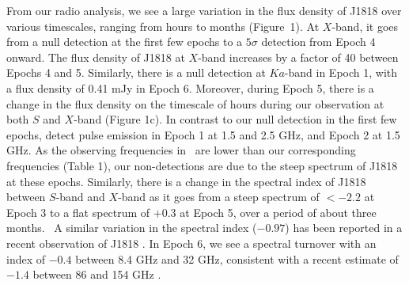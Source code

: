 \documentclass[twocolumn]{emulateapj}
\begin{document}
From our radio analysis, we see a large variation in the flux density of J1818 over various timescales, ranging from hours to months (Figure~1). At $X$-band, it goes from a null detection at the first few epochs to a $5\sigma$ detection from Epoch 4 onward. The flux density of J1818 at $X$-band increases by a factor of 40 between Epochs 4 and 5. Similarly, there is a null detection at $Ka$-band in Epoch 1, with a flux density of 0.41 mJy in Epoch 6. Moreover, during Epoch 5, there is a change in the flux density on the timescale of hours during our observation at both $S$ and $X$-band (Figure 1c). In contrast to our null detection in the first few epochs, \cite{Champion_2020} detect pulse emission in Epoch 1 at 1.5 and 2.5 GHz, and Epoch 2 at 1.5 GHz. As the observing frequencies in \cite{Champion_2020} are lower than our corresponding frequencies (Table 1), our non-detections are due to the steep spectrum of J1818 at these epochs. Similarly, there is a change in the spectral index of J1818 between $S$-band and $X$-band as it goes from a steep spectrum of $< -2.2$ at Epoch 3 to a flat spectrum of $+0.3$ at Epoch 5, over a period of about three months.  A similar variation in the spectral index ($-0.97$) has been reported in a recent observation of J1818 \citep{Liu2020}. In Epoch 6, we see a spectral turnover with an index of $-0.4$ between 8.4 GHz and 32 GHz, consistent with a recent estimate of $-1.4$ between 86 and 154 GHz \citep{Torne2020}. 
\end{document}
